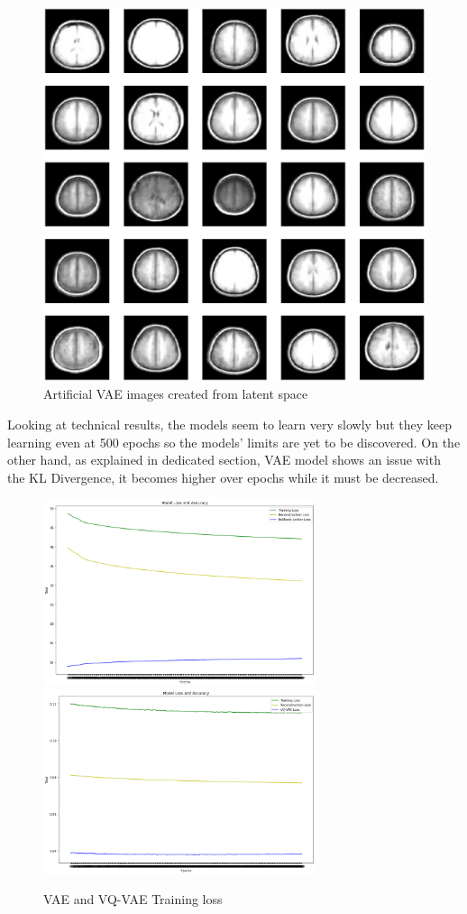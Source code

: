 \begin{figure}[ht]
    \centering
    \includegraphics[width = 17cm]{images/vae-brains-results-from-latent-space.png}
    \caption[]{Artificial VAE images created from latent space}
    \label{fig:vae-k3-brains-30-epochs}
\end{figure}

Looking at technical results, the models seem to learn very slowly but they keep learning even at 500 epochs so the models' limits are yet to be discovered. On the other hand, as explained in dedicated section, VAE model shows an issue with the KL Divergence, it becomes higher over epochs while it must be decreased.

\begin{figure}[ht]
    \includegraphics[width = 8cm]{images/vae-loss-results.png}
    \includegraphics[width = 8cm]{images/vqvae-loss-results.png}
    \caption[]{VAE and VQ-VAE Training loss}
    \label{fig:vae-and-vqvae-training-loss}
\end{figure}


